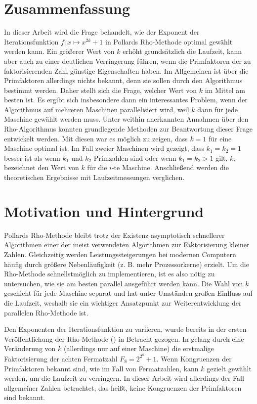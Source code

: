 \documentclass[a4paper, 11pt, ngerman]{article}
\theoremstyle{definition}
\theoremstyle{plain}
\theoremstyle{remark}
\begin{document}
\newpage

\section{Zusammenfassung}

In dieser Arbeit wird die Frage behandelt, wie der Exponent der Iterationsfunktion $f : x \mapsto x^{2k} + 1$ in Pollards Rho-Methode optimal gewählt werden kann. Ein größerer Wert von $k$ erhöht grundsätzlich die Laufzeit, kann aber auch zu einer deutlichen Verringerung führen, wenn die Primfaktoren der zu faktorisierenden Zahl günstige Eigenschaften haben. Im Allgemeinen ist über die Primfaktoren allerdings nichts bekannt, denn sie sollen durch den Algorithmus bestimmt werden. Daher stellt sich die Frage, welcher Wert von $k$ im Mittel am besten ist. Es ergibt sich insbesondere dann ein interessantes Problem, wenn der Algorithmus auf mehreren Maschinen parallelisiert wird, weil $k$ dann für jede Maschine gewählt werden muss. Unter weithin anerkannten Annahmen über den Rho-Algorithmus konnten grundlegende Methoden zur Beantwortung dieser Frage entwickelt werden. Mit diesen war es möglich zu zeigen, dass $k = 1$ für eine Maschine optimal ist. Im Fall zweier Maschinen wird gezeigt, dass $k_1 = k_2 = 1$ besser ist als wenn $k_1$ und $k_2$ Primzahlen sind oder wenn $k_1 = k_2 > 1$ gilt. $k_i$ bezeichnet den Wert von $k$ für die $i$-te Maschine. Anschließend werden die theoretischen Ergebnisse mit Laufzeitmessungen verglichen.

\section{Motivation und Hintergrund}

Pollards Rho-Methode bleibt trotz der Existenz asymptotisch schnellerer Algorithmen einer der meist verwendeten Algorithmen zur Faktorisierung kleiner Zahlen. Gleichzeitig werden Leistungssteigerungen bei modernen Computern häufig durch größere Nebenläufigkeit (z. B. mehr Prozessorkerne) erzielt. Um die Rho-Methode schnellstmöglich zu implementieren, ist es also nötig zu untersuchen, wie sie am besten parallel ausgeführt werden kann. Die Wahl von $k$ geschieht für jede Maschine separat und hat unter Umständen großen Einfluss auf die Laufzeit, weshalb sie ein wichtiger Ansatzpunkt zur Weiterentwicklung der parallelen Rho-Methode ist.

Den Exponenten der Iterationsfunktion zu variieren, wurde bereits in der ersten Veröffentlichung der Rho-Methode (\cite{pol75}) in Betracht gezogen. In \cite{bp81} gelang durch eine Veränderung von $k$ (allerdings nur auf einer Maschine) die erstmalige Faktorisierung der achten Fermatzahl $F_8 = 2^{2^8} + 1$. Wenn Kongruenzen der Primfaktoren bekannt sind, wie im Fall von Fermatzahlen, kann $k$ gezielt gewählt werden, um die Laufzeit zu verringern. In dieser Arbeit wird allerdings der Fall allgemeiner Zahlen betrachtet, das heißt, keine Kongruenzen der Primfaktoren sind bekannt.
\end{document}
